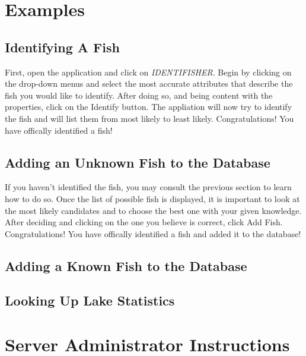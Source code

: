 \documentclass{article}
\begin{document}
\section{Examples}

\subsection{Identifying A Fish}
First, open the application and click on \textit{IDENTIFISHER}. Begin by clicking on the drop-down menus and select the most accurate attributes that describe the fish you would like to identify. After doing so, and being content with the properties, click on the Identify button. The appliation will now try to identify the fish and will list them from most likely to least likely. Congratulations! You have offically identified a fish!

\subsection{Adding an Unknown Fish to the Database}
If you haven't identified the fish, you may consult the previous section to learn how to do so. Once the list of possible fish is displayed, it is important to look at the most likely candidates and to choose the best one with your given knowledge. After deciding and clicking on the one you believe is correct, click Add Fish. Congratulations! You have offically identified a fish and added it to the database!

\subsection{Adding a Known Fish to the Database}

\subsection{Looking Up Lake Statistics}

\section{Server Administrator Instructions}
\end{document}
